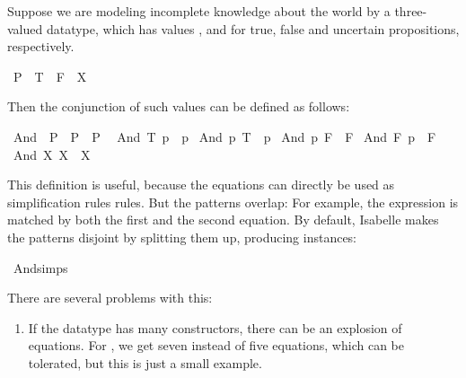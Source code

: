 \begin{isabellebody}
\begin{isamarkuptext}
  Suppose we are modeling incomplete knowledge about the world by a
  three-valued datatype, which has values , 
  and  for true, false and uncertain propositions, respectively.%
\end{isamarkuptext}%
\isamarkuptrue%
\isamarkupfalse%
\ P{}\ {\isacharequal}\ T\ {\isacharbar}\ F\ {\isacharbar}\ X%
\begin{isamarkuptext}%
\noindent Then the conjunction of such values can be defined as follows:%
\end{isamarkuptext}%
\isamarkuptrue%
\isamarkupfalse%
\ And\ {\isacharcolon}{\isacharcolon}\ {\isachardoublequoteopen}P{}\ {\isasymRightarrow}\ P{}\ {\isasymRightarrow}\ P{}{\isachardoublequoteclose}\isanewline
{}\isanewline
\ \ {\isachardoublequoteopen}And\ T\ p\ {\isacharequal}\ p{\isachardoublequoteclose}\isanewline
{\isacharbar}\ {\isachardoublequoteopen}And\ p\ T\ {\isacharequal}\ p{\isachardoublequoteclose}\isanewline
{\isacharbar}\ {\isachardoublequoteopen}And\ p\ F\ {\isacharequal}\ F{\isachardoublequoteclose}\isanewline
{\isacharbar}\ {\isachardoublequoteopen}And\ F\ p\ {\isacharequal}\ F{\isachardoublequoteclose}\isanewline
{\isacharbar}\ {\isachardoublequoteopen}And\ X\ X\ {\isacharequal}\ X{\isachardoublequoteclose}%
\begin{isamarkuptext}%
This definition is useful, because the equations can directly be used
  as simplification rules rules. But the patterns overlap: For example,
  the expression  is matched by both the first and
  the second equation. By default, Isabelle makes the patterns disjoint by
  splitting them up, producing instances:%
\end{isamarkuptext}%
\isamarkuptrue%
\isamarkupfalse%
\ And{\isachardot}simps%
\begin{isamarkuptext}%
  
  \vspace*{1em}
  \noindent There are several problems with this:

  \begin{enumerate}
  \item If the datatype has many constructors, there can be an
  explosion of equations. For , we get seven instead of
  five equations, which can be tolerated, but this is just a small
  example.


\end{enumerate}
\end{isamarkuptext}
\end{isabellebody}
